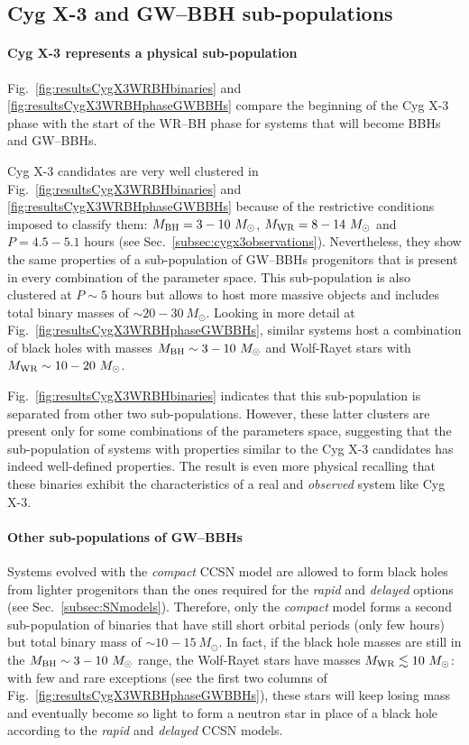 \documentclass[a4paper,titlepage]{book}     	%
\newcommand{\sun}{\ensuremath{_\odot}}
\newcommand{\msun}{\ensuremath{M\sun}}
\newcommand{\mwr}{\ensuremath{M_\textup{WR}}}
\newcommand{\mbh}{\ensuremath{M_\textup{BH}}}
\begin{document}
\subsection{Cyg X-3 and GW--BBH sub-populations}\label{subsec:CygX3phasevsGWBBHs}
\paragraph{Cyg X-3 represents a physical sub-population} Fig.\ \ref{fig:resultsCygX3WRBHbinaries} and \ref{fig:resultsCygX3WRBHphaseGWBBHs} compare the beginning of the Cyg X-3 phase with the start of the WR--BH phase for systems that will become BBHs and GW--BBHs. 

Cyg X-3 candidates are very well clustered in Fig.\ \ref{fig:resultsCygX3WRBHbinaries} and \ref{fig:resultsCygX3WRBHphaseGWBBHs} because of the restrictive conditions imposed to classify them: $\mbh = 3-10~\msun$, $\mwr = 8-14~\msun$ and $P=4.5-5.1$ hours (see Sec.\ \ref{subsec:cygx3observations}). Nevertheless, they show the same properties of a sub-population of GW--BBHs progenitors that is present in every combination of the parameter space. This sub-population is also clustered at $P \sim 5$ hours but allows to host more massive objects and includes total binary masses of $\sim 20-30~\msun$. Looking in more detail at Fig.\ \ref{fig:resultsCygX3WRBHphaseGWBBHs}, similar systems host a combination of black holes with masses $\mbh \sim 3-10~\msun$ and Wolf-Rayet stars with $\mwr \sim 10-20~\msun$. 

Fig.\ \ref{fig:resultsCygX3WRBHbinaries} indicates that this sub-population is separated from other two sub-populations. However, these latter clusters are present only for some combinations of the parameters space, suggesting that the sub-population of systems with properties similar to the Cyg X-3 candidates has indeed well-defined properties. The result is even more physical recalling that these binaries exhibit the characteristics of a real and \emph{observed} system like Cyg X-3.

\paragraph{Other sub-populations of GW--BBHs} Systems evolved with the \emph{compact} CCSN model are allowed to form black holes from lighter progenitors than the ones required for the \emph{rapid} and \emph{delayed} options (see Sec.\ \ref{subsec:SNmodels}). Therefore, only the \emph{compact} model forms a second sub-population of binaries that have still short orbital periods (only few hours) but total binary mass of $\sim 10 - 15~\msun$. In fact, if the black hole masses are still in the $\mbh \sim 3-10~\msun$ range, the Wolf-Rayet stars have masses $\mwr \lesssim 10~\msun$: with few and rare exceptions (see the first two columns of Fig.\ \ref{fig:resultsCygX3WRBHphaseGWBBHs}), these stars will keep losing mass and eventually become so light to form a neutron star in place of a black hole according to the \emph{rapid} and \emph{delayed} CCSN models.\\
\end{document}
